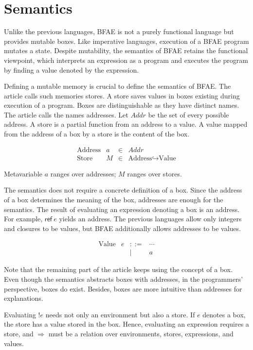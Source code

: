 \section{Semantics
}

Unlike the previous languages, BFAE is not a purely functional language but
provides mutable boxes. Like imperative languages, execution of a BFAE program
mutates a state. Despite mutability, the semantics of BFAE retains the functional
viewpoint, which interprets an expression as a program and executes the program
by finding a value denoted by the expression.

Defining a mutable memory is crucial to define the semantics of BFAE. The article
calls such memories stores. A store saves values in boxes existing during
execution of a program. Boxes are distinguishable as they have distinct names.
The article calls the names addresses. Let \(Addr\) be the set of every
possible address. A store is a partial function from an address to a value. A
value mapped from the address of a box by a store is the content of the box.

\[
\begin{array}{lrcl}
\text{Address} & a & \in & \mathit{Addr} \\
\text{Store} & M & \in & \text{Address}\hookrightarrow\text{Value}
\end{array}
\]

Metavariable \(a\) ranges over addresses; \(M\) ranges over stores.

The semantics does not require a concrete definition of a box. Since the address
of a box determines the meaning of the box, addresses are enough for the
semantics. The result of evaluating an expression denoting a box is an address.
For example, \(\textsf{ref}\ e\) yields an address. The previous languages allow
only integers and closures to be values, but BFAE additionally allows addresses
to be values.

\[
\begin{array}{lrcl}
\text{Value} & e & ::= & \cdots \\
&& | & a
\end{array}
\]

Note that the remaining part of the article keeps using the concept of a box.
Even though the semantics abstracts boxes with addresses, in the programmers'
perspective, boxes do exist. Besides, boxes are more intuitive than addresses for
explanations.

Evaluating \(!e\) needs not only an environment but also a store. If \(e\)
denotes a box, the store has a value stored in the box. Hence, evaluating an
expression requires a store, and \(\Rightarrow\) must be a relation over
environments, stores, expressions, and values.

